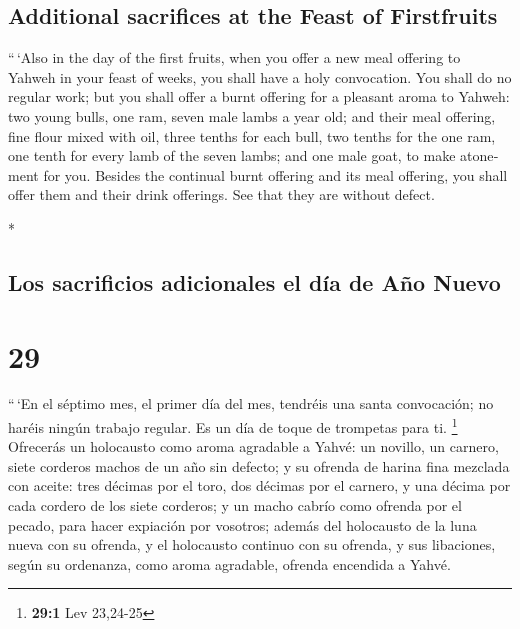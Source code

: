 \begin{paracol}{2}
\begin{otherlanguage}{english}
\hypertarget{additional-sacrifices-at-the-feast-of-firstfruits}{%
\subsection{Additional sacrifices at the Feast of
Firstfruits}\label{additional-sacrifices-at-the-feast-of-firstfruits}}

 ``\,`Also in the day of the first fruits, when you offer
a new meal offering to Yahweh in your feast of weeks, you shall have a
holy convocation. You shall do no regular work;  but you
shall offer a burnt offering for a pleasant aroma to Yahweh: two young
bulls, one ram, seven male lambs a year old;  and their
meal offering, fine flour mixed with oil, three tenths for each bull,
two tenths for the one ram,  one tenth for every lamb of
the seven lambs;  and one male goat, to make atonement
for you.  Besides the continual burnt offering and its
meal offering, you shall offer them and their drink offerings. See that
they are without defect.

\end{otherlanguage}

\switchcolumn[0]*

\hypertarget{los-sacrificios-adicionales-el-duxeda-de-auxf1o-nuevo}{%
\subsection{Los sacrificios adicionales el día de Año
Nuevo}\label{los-sacrificios-adicionales-el-duxeda-de-auxf1o-nuevo}}

\hypertarget{section-56}{%
\section{29}\label{section-56}}

 ``\,`En el séptimo mes, el primer día del mes, tendréis
una santa convocación; no haréis ningún trabajo regular. Es un día de
toque de trompetas para ti. \footnote{\textbf{29:1} Lev 23,24-25}
 Ofrecerás un holocausto como aroma agradable a Yahvé: un
novillo, un carnero, siete corderos machos de un año sin defecto;
 y su ofrenda de harina fina mezclada con aceite: tres
décimas por el toro, dos décimas por el carnero,  y una
décima por cada cordero de los siete corderos;  y un macho
cabrío como ofrenda por el pecado, para hacer expiación por vosotros;
 además del holocausto de la luna nueva con su ofrenda, y
el holocausto continuo con su ofrenda, y sus libaciones, según su
ordenanza, como aroma agradable, ofrenda encendida a Yahvé.


\end{paracol}
